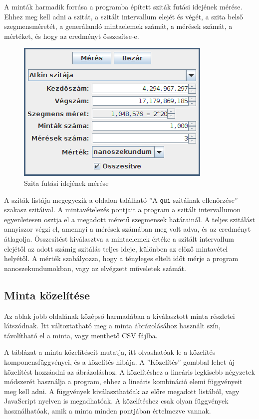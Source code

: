 A minták harmadik forrása a programba épített sziták futási idejének mérése.
Ehhez meg kell adni a szitát, a szitált intervallum elejét és végét, a szita belső szegmensméretét, a generálandó mintaelemek számát, a mérések számát, a mértéket, és hogy az eredményt összesítse-e.

\begin{figure}[h]
\caption{Szita futási idejének mérése}
\centering
\includegraphics[scale=1.0]{measure.png}
\end{figure}

A sziták listája megegyezik a \pageref{sec:szitak-ellenorzese} oldalon található ''A \texttt{gui} szitáinak ellenőrzése'' szakasz szitáival.
A mintavételezés pontjait a program a szitált intervallumon egyenletesen osztja el a megadott méretű szegmensek határainál.
A teljes szitálást annyiszor végzi el, amennyi a mérések számában meg volt adva, és az eredményt átlagolja.
Összesítést kiválasztva a mintaelemek értéke a szitált intervallum elejétől az adott számig szitálás teljes ideje, különben az előző mintavétel helyétől.
A mérték szabályozza, hogy a tényleges eltelt időt mérje a program nanoszekundumokban, vagy az elvégzett műveletek számát.

\subsection{Minta közelítése}

Az ablak jobb oldalának középső harmadában a kiválasztott minta részletei látszódnak.
Itt változtatható meg a minta ábrázolásához használt szín, távolítható el a minta, vagy menthető CSV fájlba.

A táblázat a minta közelítéseit mutatja, itt olvashatóak le a közelítés komponensfüggvényei, és a közelítés hibája.
A ''Közelítés'' gombbal lehet új közelítést hozzáadni az ábrázoláshoz.
A közelítéshez a lineáris legkisebb négyzetek módszerét használja a program, ehhez a lineáris kombináció elemi függvényeit meg kell adni.
A függvények kiválaszthatóak az előre megadott listából, vagy JavaScript nyelven is megadhatóak.
A közelítéshez csak olyan függvények használhatóak, amik a minta minden pontjában értelmezve vannak.

